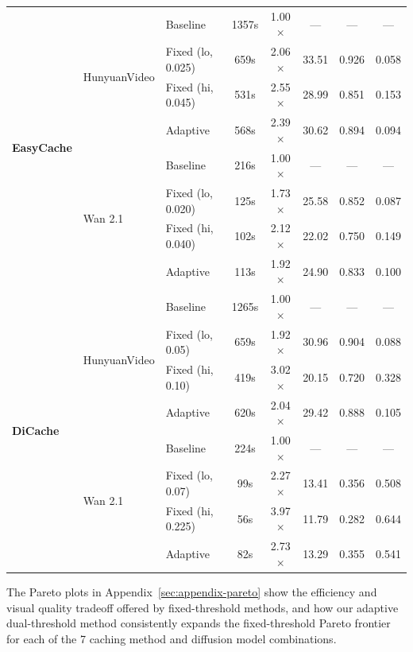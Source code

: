 \documentclass{article}
\begin{document}
\begin{table}[t]
\begin{tabular}{lllccccc}
\multirow{8}{*}{\textbf{EasyCache}}
  & \multirow{4}{*}{HunyuanVideo}
    & Baseline          & 1357s & 1.00$\times$ & ---   & ---   & ---   \\
  & & Fixed (lo, 0.025) & 659s  & 2.06$\times$ & 33.51 & 0.926 & 0.058 \\
  & & Fixed (hi, 0.045) & 531s  & 2.55$\times$ & 28.99 & 0.851 & 0.153 \\
  & & Adaptive          & 568s  & 2.39$\times$ & 30.62 & 0.894 & 0.094 \\
\cmidrule{2-8}
  & \multirow{4}{*}{Wan 2.1}
    & Baseline          & 216s  & 1.00$\times$ & ---   & ---   & ---   \\
  & & Fixed (lo, 0.020) & 125s  & 1.73$\times$ & 25.58 & 0.852 & 0.087 \\
  & & Fixed (hi, 0.040) & 102s  & 2.12$\times$ & 22.02 & 0.750 & 0.149 \\
  & & Adaptive          & 113s  & 1.92$\times$ & 24.90 & 0.833 & 0.100 \\
\midrule

\multirow{8}{*}{\textbf{DiCache}}
  & \multirow{4}{*}{HunyuanVideo}
    & Baseline          & 1265s & 1.00$\times$ & ---   & ---   & ---   \\
  & & Fixed (lo, 0.05)  & 659s  & 1.92$\times$ & 30.96 & 0.904 & 0.088 \\
  & & Fixed (hi, 0.10)  & 419s  & 3.02$\times$ & 20.15 & 0.720 & 0.328 \\
  & & Adaptive          & 620s  & 2.04$\times$ & 29.42 & 0.888 & 0.105 \\
\cmidrule{2-8}
  & \multirow{4}{*}{Wan 2.1}
    & Baseline          & 224s  & 1.00$\times$ & ---   & ---   & ---   \\
  & & Fixed (lo, 0.07)  & 99s   & 2.27$\times$ & 13.41 & 0.356 & 0.508 \\
  & & Fixed (hi, 0.225) & 56s   & 3.97$\times$ & 11.79 & 0.282 & 0.644 \\
  & & Adaptive          & 82s   & 2.73$\times$ & 13.29 & 0.355 & 0.541 \\
\bottomrule
\end{tabular}
\end{table}

The Pareto plots in Appendix~\ref{sec:appendix-pareto} show the efficiency and visual quality tradeoff offered by fixed-threshold methods, and how our adaptive dual-threshold method consistently expands the fixed-threshold Pareto frontier for each of the 7 caching method and diffusion model combinations.
\end{document}
